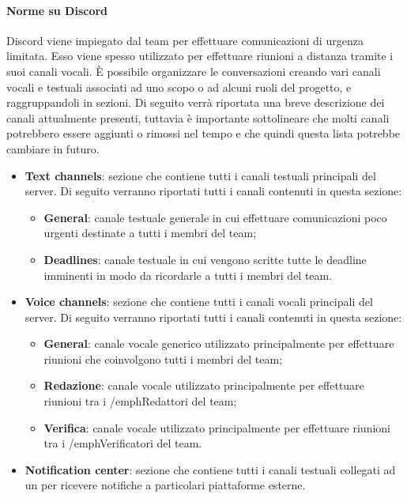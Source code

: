 \paragraph{Norme su Discord}\Spazio
 Discord viene impiegato dal team per effettuare comunicazioni di urgenza limitata. Esso viene spesso utilizzato per effettuare riunioni a distanza tramite i suoi canali vocali. 
 È possibile organizzare le conversazioni creando vari canali vocali e testuali associati ad uno scopo o ad alcuni ruoli del progetto, e raggruppandoli in sezioni. Di seguito verrà riportata una breve descrizione dei canali attualmente presenti, tuttavia è importante sottolineare che molti canali potrebbero essere aggiunti o rimossi nel tempo e che quindi questa lista potrebbe cambiare in futuro.\newline
 \begin{itemize}
	\item{\textbf{Text channels}: sezione che contiene tutti i canali testuali principali del server. Di seguito verranno riportati tutti i canali contenuti in questa sezione:
		\begin{itemize}
			\item{\textbf{General}: canale testuale generale in cui effettuare comunicazioni poco urgenti destinate a tutti i membri del team;}
			\item{\textbf{Deadlines}: canale testuale in cui vengono scritte tutte le deadline imminenti in modo da ricordarle a tutti i membri del team.}
		\end{itemize}
	}
	\item{\textbf{Voice channels}: sezione che contiene tutti i canali vocali principali del server. Di seguito verranno riportati tutti i canali contenuti in questa sezione:
		\begin{itemize}
			\item{\textbf{General}: canale vocale generico utilizzato principalmente per effettuare riunioni che coinvolgono tutti i membri del team;}
			\item{\textbf{Redazione}: canale vocale utilizzato principalmente per effettuare riunioni tra i /emph{Redattori} del team;}
			\item{\textbf{Verifica}: canale vocale utilizzato principalmente per effettuare riunioni tra i /emph{Verificatori} del team.}
		\end{itemize}
	}
	\item{\textbf{Notification center}: sezione che contiene tutti i canali testuali collegati ad un  per ricevere notifiche a particolari piattaforme esterne.
}
\end{itemize}
